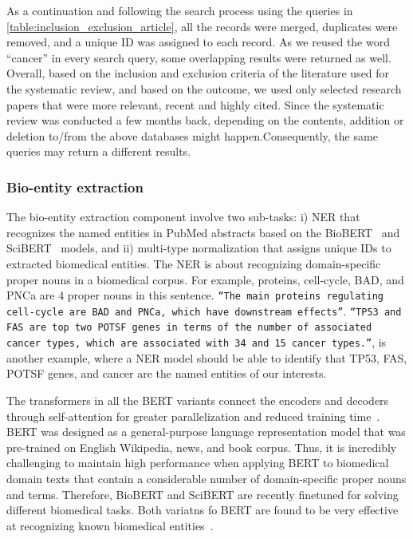 \hspace*{3.5mm} As a continuation and following the search process using the queries in \cref{table:inclusion_exclusion_article}, all the records were merged, duplicates were removed, and a unique ID was assigned to each record. As we reused the word ``cancer'' in every search query, some overlapping results were returned as well. %
Overall, based on the inclusion and exclusion criteria of the literature used for the systematic review, and based on the outcome, we used only selected research papers that were more relevant, recent and highly cited. Since the systematic review was conducted a few months back, depending on the contents, addition or deletion  to/from  the above databases might happen.Consequently, the same queries may return a different results.

\subsubsection{Bio-entity extraction}
The bio-entity extraction component involve two sub-tasks: i) NER that recognizes the named entities in PubMed abstracts based on the BioBERT~\cite{BioBERT} and SciBERT~\cite{SciBERT} models, and ii) multi-type normalization that assigns unique IDs to extracted biomedical entities. The NER is about recognizing domain-specific proper nouns in a biomedical corpus. For example, proteins, cell-cycle, BAD, and PNCa are 4 proper nouns in this sentence. \texttt{``The main proteins regulating cell-cycle are BAD and PNCa, which have downstream effects''}. \texttt{``TP53 and FAS are top two POTSF genes in terms of the number of associated cancer types, which are associated with 34 and 15 cancer types.''}, is another example, where a NER model should be able to identify that TP53, FAS, POTSF genes, and cancer are the named entities of our interests. 

\hspace*{3.5mm} The transformers in all the BERT variants connect the encoders and decoders through self-attention for greater parallelization and reduced training time~\cite{hasan2020knowledge,kim2019neural}. BERT was designed as a general-purpose language representation model that was pre-trained on English Wikipedia, news, and book corpus. Thus, it is incredibly challenging to maintain high performance when applying BERT to biomedical domain texts that contain a considerable number of domain-specific proper nouns and terms. 
Therefore, BioBERT and SciBERT are recently finetuned for solving different biomedical tasks. Both variatns fo BERT are found to be very effective at recognizing known biomedical entities~\cite{kim2019neural}. 


